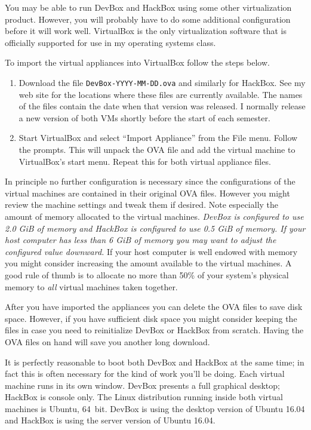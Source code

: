 \documentclass[twocolumn]{article}
\begin{document}
You may be able to run DevBox and HackBox using some other virtualization product. However, you
will probably have to do some additional configuration before it will work well. VirtualBox is
the only virtualization software that is officially supported for use in my operating systems
class.

To import the virtual appliances into VirtualBox follow the steps below.

\begin{enumerate}

\item Download the file \texttt{DevBox-YYYY-MM-DD.ova} and similarly for HackBox. See my web
  site for the locations where these files are currently available. The names of the files
  contain the date when that version was released. I normally release a new version of both VMs
  shortly before the start of each semester.

\item Start VirtualBox and select ``Import Appliance'' from the File menu. Follow the prompts.
  This will unpack the OVA file and add the virtual machine to VirtualBox's start menu. Repeat
  this for both virtual appliance files.

\end{enumerate}

In principle no further configuration is necessary since the configurations of the virtual
machines are contained in their original OVA files. However you might review the machine
settings and tweak them if desired. Note especially the amount of memory allocated to the
virtual machines. \emph{DevBox is configured to use 2.0 GiB of memory and HackBox is configured
  to use 0.5 GiB of memory. If your host computer has less than 6 GiB of memory you may want to
  adjust the configured value downward.} If your host computer is well endowed with memory you
might consider increasing the amount available to the virtual machines. A good rule of thumb is
to allocate no more than 50\% of your system's physical memory to \emph{all} virtual machines
taken together.

After you have imported the appliances you can delete the OVA files to save disk space. However,
if you have sufficient disk space you might consider keeping the files in case you need to
reinitialize DevBox or HackBox from scratch. Having the OVA files on hand will save you another
long download.

It is perfectly reasonable to boot both DevBox and HackBox at the same time; in fact this is
often necessary for the kind of work you'll be doing. Each virtual machine runs in its own
window. DevBox presents a full graphical desktop; HackBox is console only. The Linux
distribution running inside both virtual machines is Ubuntu, 64~bit. DevBox is using the desktop
version of Ubuntu 16.04 and HackBox is using the server version of Ubuntu 16.04.
\end{document}
